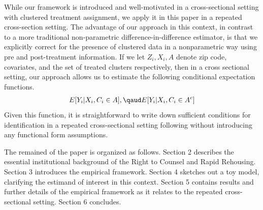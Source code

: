 \documentclass[a4paper,12pt]{article}
\begin{document}

While our framework is introduced and well-motivated in a cross-sectional setting with clustered treatment assignment, we apply it in this paper in a repeated cross-section setting. The advantage of our approach in this context, in contrast to a more traditional non-parametric difference-in-difference estimator, is that we explicitly correct for the presence of clustered data in a nonparametric way using pre and post-treatment information. If we let $Z_i, X_i, A$ denote zip code, covariates, and the set of treated clusters respectively, then in a cross sectional setting, our approach allows us to estimate the following conditional expectation functions. 
\begin{align*}
    E[Y_i |X_i, C_i \in A], \qaud    E[Y_i |X_i, C_i \in A^c]
\end{align*}
Given this function, it is straightforward to write down sufficient conditions for identification in a repeated cross-sectional setting following \cite{angrist2009mostly} without introducing any functional form assumptions. \par 

The remained of the paper is organized as follows. Section 2 describes the essential institutional background of the Right to Counsel and Rapid Rehousing. Section 3 introduces the empirical framework. Section 4 sketches out a toy model, clarifying the estimand of interest in this context. Section 5 contains results and further details of the empirical framework as it relates to the repeated cross-sectional setting. Section 6 concludes.   










\end{document}

